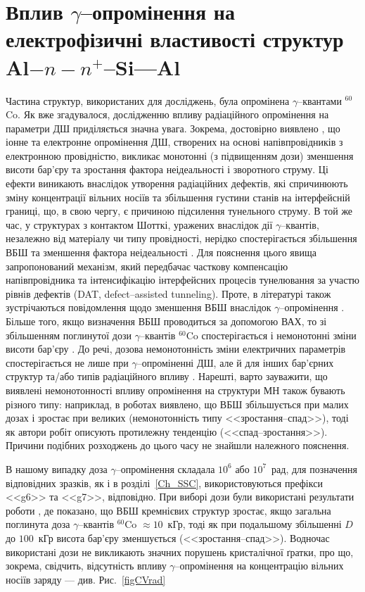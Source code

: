 \section{Вплив $\gamma$--опромінення на електрофізичні властивості структур Al$-n-n^+$--Si---Al\label{MSSi_Rad}}
Частина структур, використаних для досліджень, була опромінена $\gamma$--квантами $^{60}$Co.
Як вже згадувалося, дослідженню впливу радіаційного опромінення на параметри ДШ приділяється значна увага.
Зокрема, достовірно виявлено \cite{Kumar1, Rao, Kumar2, Sharma, Ohyama}, що іонне та електронне опромінення ДШ,
створених на основі напівпровідників з електронною провідністю, викликає
монотонні (з підвищенням дози) зменшення висоти бар'єру та зростання фактора неідеальності і зворотного струму.
Ці ефекти виникають внаслідок утворення радіаційних дефектів, які спричинюють зміну концентрації вільних носіїв та
збільшення густини станів на інтерфейсній границі, що, в свою чергу, є причиною підсилення тунельного струму.
В той же час, у структурах з контактом Шотткі, уражених внаслідок дії $\gamma$--квантів, незалежно від матеріалу чи типу провідності,
нерідко спостерігається збільшення ВБШ та зменшення фактора неідеальності \cite{Tataroglu,Tascioglu2010old,Tataroglu:2007NIMA}.
Для пояснення цього явища запропонований \cite{Tataroglu:2007NIMA} механізм, який передбачає
часткову компенсацію напівпровідника та інтенсифікацію інтерфейсних процесів тунелювання за участю рівнів дефектів (DAT, defect--assisted tunneling).
Проте, в літературі також зустрічаються повідомлення щодо зменшення ВБШ внаслідок $\gamma$--опромінення \cite{Tataroglu3}.
Більше того, якщо визначення ВБШ проводиться за допомогою ВАХ, то зі збільшенням поглинутої дози $\gamma$--квантів $^{60}$Co спостерігається
і немонотонні зміни висоти бар'єру \cite{Karatas:2006NIMA,Umana,Verma}.
До речі, дозова немонотонність зміни електричних параметрів спостерігається не лише при $\gamma$--опроміненні ДШ,
але й для інших бар'єрних структур \cite{Kinoshita} та/або типів радіаційного впливу \cite{Vorobets, Pattabi, Kovalyuk}.
Нарешті, варто зауважити, що виявлені немонотонності впливу опромінення на структури МН також бувають різного типу:
наприклад, в роботах \cite{Karatas:2006NIMA, Vorobets, Pattabi} виявлено, що ВБШ збільшується
при малих дозах і зростає при великих (немонотонність типу <<зростання--спад>>), тоді як автори робіт \cite{Umana,Verma} описують протилежну тенденцію (<<спад--зростання>>).
Причини подібних розходжень до цього часу не знайшли належного пояснення.

В нашому випадку доза $\gamma$--опромінення складала $10^6$ або $10^7$~рад, для позначення відповідних зразків, як і в розділі~\ref{Ch_SSC}, використовуються префікси <<g6>> та <<g7>>, відповідно.
При виборі дози були використані результати роботи \cite{Karatas:2006NIMA}, де показано,
що ВБШ кремнієвих структур зростає, якщо загальна поглинута доза $\gamma$--квантів $^{60}$Co $\approx10$~кГр, тоді як при подальшому збільшенні
$D$ до $100$~кГр висота бар'єру зменшується (<<зростання--спад>>).
Водночас використані дози не викликають значних порушень кристалічної ґратки,
про що, зокрема, свідчить, відсутність впливу $\gamma$--опромінення на концентрацію вільних носіїв заряду --- див. Рис.~\ref{figCVrad}

